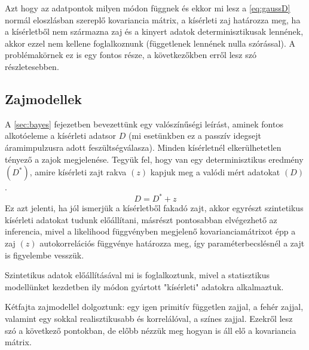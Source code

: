 Azt hogy az adatpontok milyen módon függnek és ekkor mi lesz a \ref{eq:gaussD} normál eloszlásban szereplő kovariancia mátrix, a kísérleti zaj határozza meg, ha a kísérletből nem származna zaj és a kinyert adatok determinisztikusak lennének, akkor ezzel nem kellene foglalkoznunk (függetlenek lennének nulla szórással). A problémakörnek ez is egy fontos része, a következőkben erről lesz szó részletesebben.




\FloatBarrier
\subsection{Zajmodellek}\label{sec:noise}
A \ref{sec:bayes} fejezetben bevezettünk egy valószínűségi leírást, aminek fontos alkotóeleme a kísérleti adatsor $D$ (mi esetünkben ez a passzív idegsejt áramimpulzusra adott feszültségválasza). Minden kísérletnél elkerülhetetlen tényező a zajok megjelenése. Tegyük fel, hogy van egy determinisztikus eredmény $(D^*)$, amire kísérleti zajt rakva $(z)$ kapjuk meg a valódi mért adatokat $(D)$. 
\[
D = D^* + z
\]
Ez azt jelenti, ha jól ismerjük a kísérletből fakadó zajt, akkor egyrészt szintetikus kísérleti adatokat tudunk előállítani, másrészt pontosabban elvégezhető az inferencia, mivel a likelihood függvényben megjelenő kovarianciamátrixot épp a zaj $(z)$ autokorrelációs függvénye határozza meg, így paraméterbecslésnél a zajt is figyelembe vesszük.

Szintetikus adatok előállításával mi is foglalkoztunk, mivel a statisztikus modellünket kezdetben ily módon gyártott "kísérleti" adatokra alkalmaztuk.

Kétfajta zajmodellel dolgoztunk: egy igen primitív független zajjal, a fehér zajjal, valamint egy sokkal realisztikusabb és korrelálóval, a színes zajjal. Ezekről lesz szó a következő pontokban, de előbb nézzük meg hogyan is áll elő a kovariancia mátrix.

